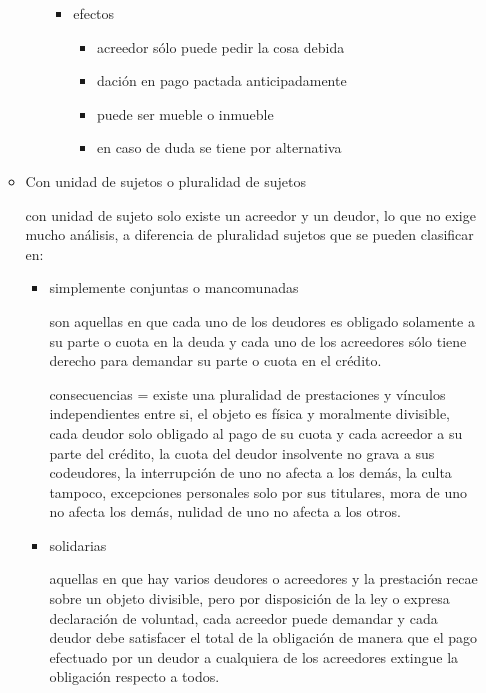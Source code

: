 \documentclass[]{article}
\providecommand{\tightlist}{%
  \setlength{\itemsep}{0pt}\setlength{\parskip}{0pt}}
\begin{document}
\begin{itemize}
\begin{itemize}
\begin{itemize}
      \begin{itemize}
      \tightlist
      \item
        efectos

        \begin{itemize}
        \tightlist
        \item
          acreedor sólo puede pedir la cosa debida
        \item
          dación en pago pactada anticipadamente
        \item
          puede ser mueble o inmueble
        \item
          en caso de duda se tiene por alternativa
        \end{itemize}
      \end{itemize}
    \end{itemize}
  \item
    Con unidad de sujetos o pluralidad de sujetos

    con unidad de sujeto solo existe un acreedor y un deudor, lo que no
    exige mucho análisis, a diferencia de pluralidad sujetos que se
    pueden clasificar en:

    \begin{itemize}
    \item
      simplemente conjuntas o mancomunadas

      son aquellas en que cada uno de los deudores es obligado solamente
      a su parte o cuota en la deuda y cada uno de los acreedores sólo
      tiene derecho para demandar su parte o cuota en el crédito.

      consecuencias = existe una pluralidad de prestaciones y vínculos
      independientes entre si, el objeto es física y moralmente
      divisible, cada deudor solo obligado al pago de su cuota y cada
      acreedor a su parte del crédito, la cuota del deudor insolvente no
      grava a sus codeudores, la interrupción de uno no afecta a los
      demás, la culta tampoco, excepciones personales solo por sus
      titulares, mora de uno no afecta los demás, nulidad de uno no
      afecta a los otros.
    \item
      solidarias

      aquellas en que hay varios deudores o acreedores y la prestación
      recae sobre un objeto divisible, pero por disposición de la ley o
      expresa declaración de voluntad, cada acreedor puede demandar y
      cada deudor debe satisfacer el total de la obligación de manera
      que el pago efectuado por un deudor a cualquiera de los acreedores
      extingue la obligación respecto a todos.


\end{itemize}
\end{itemize}
\end{itemize}
\end{document}

